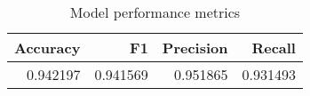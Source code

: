 \begin{table}
\centering
\caption{Model performance metrics}
\label{baseline-metrics}
\begin{tabular}{rrrr}
\toprule
 Accuracy &        F1 &  Precision &    Recall \\
\midrule
 0.942197 &  0.941569 &   0.951865 &  0.931493 \\
\bottomrule
\end{tabular}
\end{table}

